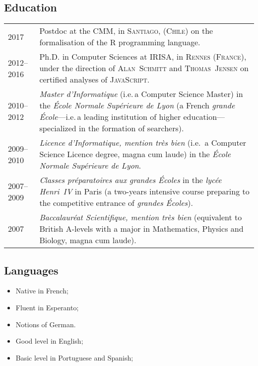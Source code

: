 \documentclass[12pt,a4paper]{article}
\makeatletter
\newcommand{\fr}[1]{\foreignlanguage{francais}{\textit{#1}}}
\newcommand{\ie}{i.e.\,}
\newenvironment{datecvsection}[1]%
               {\subsection*{#1}%
                 \noindent \begin{tabular}{@{}p{\annee}p{\texte}@{}}}
               {\end{tabular}}
\newenvironment{cvsection}[1]%
               {\subsection*{#1}}
               {}
\makeatother
\begin{document}
\begin{datecvsection}{Education}

    2017 & Postdoc at the \textsc{CMM}, in \textsc{Santiago}, (\textsc{Chile}) on the formalisation of the \textsc{R} programming language. \\

    2012–2016 & Ph.D. in Computer Sciences at \textsc{IRISA}, in \textsc{Rennes} (\textsc{France}), under the direction of \textsc{Alan~Schmitt} and \textsc{Thomas~Jensen} on certified analyses of \textsc{JavaScript}. \\

	2010–2012 & \fr{Master d’Informatique} (\ie a Computer Science
	Master) in the \fr{École Normale Supérieure de Lyon} (a French
	\fr{grande École}—\ie a leading institution of higher
    education—specialized in the formation of searchers). \\

	2009–2010 & \fr{Licence d’Informatique, mention très bien} (\ie
	a Computer Science Licence degree, magna cum laude) in the
	\fr{École Normale Supérieure de Lyon}. \\

	2007–2009 & \fr{Classes préparatoires aux grandes Écoles} in the
	\fr{lycée Henri~IV} in Paris (a two-years intensive course
	preparing to the competitive entrance of \fr{grandes Écoles}). \\

	2007 & \fr{Baccalauréat Scientifique, mention très bien}
	(equivalent to British A-levels with a major in Mathematics, Physics
	and Biology, magna cum laude). \\

\end{datecvsection}

\begin{cvsection}{Languages}
\parbox{.45\textwidth}{
\begin{itemize}
   \item Native in French;
   \item Fluent in Esperanto;
   \item Notions of German.
\end{itemize}}
\parbox{.45\textwidth}{
\begin{itemize}
   \item Good level in English;
   \item Basic level in Portuguese and Spanish;
\end{itemize}}
\end{cvsection}
\end{document}
